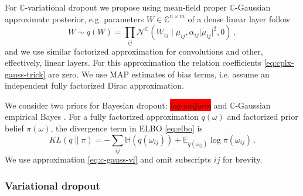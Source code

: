 \documentclass[a4paper,10pt]{article}
\newcommand{\cplx}{\mathbb{C}}
\newcommand{\verify}[1]{\textit{\!\colorbox{red}{#1}\!}}
\begin{document}
For $\cplx$-variational dropout we propose using mean-field proper $\cplx$-Gaussian approximate
posterior, e.g. parameters $W \in \cplx^{n\times m}$ of a dense linear layer follow
\begin{equation}  \label{eq:c-gauss-vi}
  W \sim q(W)
    = \prod_{ij} \mathcal{N}^{\cplx}(
      W_{ij} \mid
        \mu_{ij},
        \alpha_{ij} \lvert \mu_{ij} \rvert^2,
        0
    )
  \,,
\end{equation}
and we use similar factorized approximation for convolutions and other, effectively, linear
layers. For this approximation the relation coefficients \eqref{eq:cplx-gauss-trick} are
zero. We use MAP estimates of bias terms, i.e. assume an independent fully factorized Dirac
approximation.

We consider two priors for Bayesian dropout: \verify{log-uniform} and $\cplx$-Gaussian empirical
Bayes \citep{kingma_variational_2015,molchanov_variational_2017,kharitonov_variational_2018}.
For a fully factorized approximation $q(\omega)$ and factorized prior belief $\pi(\omega)$,
the divergence term in ELBO \eqref{eq:elbo} is
\begin{equation}  \label{eq:elbo-general-kl-div}
  KL(q \| \pi)
    = - \sum_{ij}
        \mathbb{H}(q(\omega_{ij}))
        + \mathbb{E}_{q(\omega_{ij})} \log{\pi(\omega_{ij})}
    \,.
\end{equation}
We use approximation \eqref{eq:c-gauss-vi} and omit subscripts ${ij}$ for brevity.

\subsubsection{Variational dropout} %
\label{ssub:variational_dropout}
\end{document}
